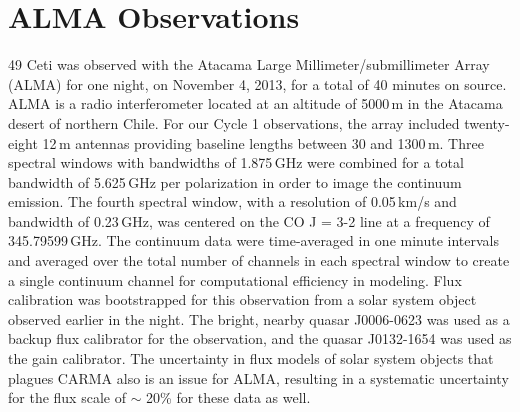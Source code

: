 \section{ALMA Observations}
\label{ALMA Observations}
49 Ceti was observed with the Atacama Large Millimeter/submillimeter Array (ALMA) for one night, on November 4, 2013, for a total of 40 minutes on source. ALMA is a radio interferometer located at an altitude of 5000\,m in the Atacama desert of northern Chile. For our Cycle 1 observations, the array included twenty-eight 12\,m antennas providing baseline lengths between 30 and 1300\,m. Three spectral windows with bandwidths of 1.875\,GHz were combined for a total bandwidth of 5.625\,GHz per polarization in order to image the continuum emission. The fourth spectral window, with a resolution of 0.05\,km/s and bandwidth of 0.23\,GHz, was centered on the CO J = 3-2 line at a frequency of 345.79599\,GHz. The continuum data were time-averaged in one minute intervals and averaged over the total number of channels in each spectral window to create a single continuum channel for computational efficiency in modeling. Flux calibration was bootstrapped for this observation from a solar system object observed earlier in the night. The bright, nearby quasar J0006-0623 was used as a backup flux calibrator for the observation, and the quasar J0132-1654 was used as the gain calibrator. The uncertainty in flux models of solar system objects that plagues CARMA also is an issue for ALMA, resulting in a systematic uncertainty for the flux scale of $\sim$ 20\% for these data as well. 




	 
